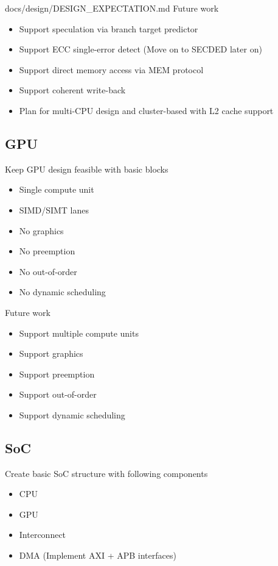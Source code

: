 \begin{relocated}{docs/design/DESIGN_EXPECTATION.md}
Future work

\begin{itemize}
\tightlist
\item
  Support speculation via branch target predictor
\item
  Support ECC single-error detect (Move on to SECDED later on)
\item
  Support direct memory access via MEM protocol
\item
  Support coherent write-back
\item
  Plan for multi-CPU design and cluster-based with L2 cache support
\end{itemize}

\subsection{GPU}\label{ds:ch:design-expectation:gpu}

Keep GPU design feasible with basic blocks

\begin{itemize}
\tightlist
\item
  Single compute unit
\item
  SIMD/SIMT lanes
\item
  No graphics
\item
  No preemption
\item
  No out-of-order
\item
  No dynamic scheduling
\end{itemize}

Future work

\begin{itemize}
\tightlist
\item
  Support multiple compute units
\item
  Support graphics
\item
  Support preemption
\item
  Support out-of-order
\item
  Support dynamic scheduling
\end{itemize}

\subsection{SoC}\label{ds:ch:design-expectation:soc}

Create basic SoC structure with following components

\begin{itemize}
\tightlist
\item
  CPU
\item
  GPU
\item
  Interconnect
\item
  DMA (Implement AXI + APB interfaces)


\end{itemize}
\end{relocated}
